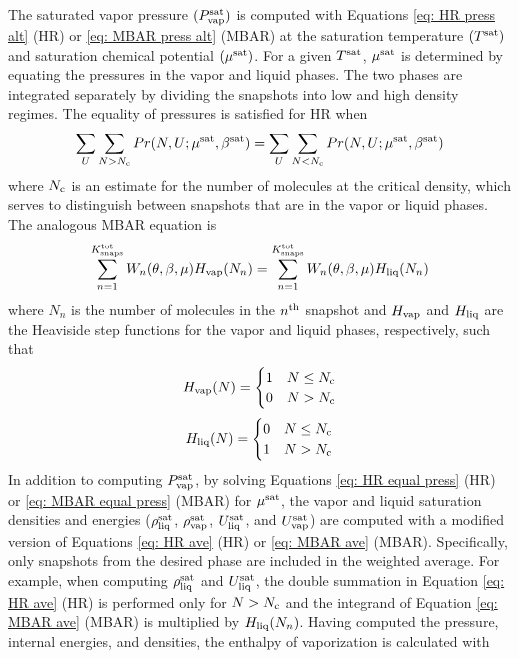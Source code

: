 \documentclass[journal=jced,manuscript=article]{achemso}
\begin{document}
The saturated vapor pressure $(P_{\rm vap}^{\rm sat})$ is computed with Equations \ref{eq: HR press alt} (HR) or \ref{eq: MBAR press alt} (MBAR) at the saturation temperature $(T^{\rm sat})$ and saturation chemical potential $(\mu^{\rm sat})$. For a given $T^{\rm sat}$, $\mu^{\rm sat}$ is determined by equating the pressures in the vapor and liquid phases. The two phases are integrated separately by dividing the snapshots into low and high density regimes. The equality of pressures is satisfied for HR when
\begin{eqnarray} \label{eq: HR equal press}
\sum_{U} \sum_{N > N_{\rm c}} Pr(N,U;\mu^{\rm sat},\beta^{\rm sat}) = \sum_{U} \sum_{N < N_{\rm c}} Pr(N,U;\mu^{\rm sat},\beta^{\rm sat})
\end{eqnarray}
where $N_{\rm c}$ is an estimate for the number of molecules at the critical density, which serves to distinguish between snapshots that are in the vapor or liquid phases. The analogous MBAR equation is
\begin{eqnarray} \label{eq: MBAR equal press}
\sum_{n=1}^{K^{\rm tot}_{\rm snaps}} W_{n}(\theta,\beta,\mu) H_{\rm vap}(N_n) = \sum_{n=1}^{K^{\rm tot}_{\rm snaps}} W_{n}(\theta,\beta,\mu) H_{\rm liq}(N_n)
\end{eqnarray}
where $N_n$ is the number of molecules in the $n^{\rm th}$ snapshot and $H_{\rm vap}$ and $H_{\rm liq}$ are the Heaviside step functions for the vapor and liquid phases, respectively, such that
\begin{eqnarray}
H_{\rm vap}(N) =
 \begin{cases}
 1 & N \leq N_{\rm c} \\
 0 & N > N_{\rm c} 
 \end{cases}
\end{eqnarray}
\begin{eqnarray}
H_{\rm liq}(N) =
\begin{cases}
0 & N \leq N_{\rm c} \\
1 & N > N_{\rm c}
\end{cases}
\end{eqnarray}
In addition to computing $P_{\rm vap}^{\rm sat}$, by solving Equations \ref{eq: HR equal press} (HR) or \ref{eq: MBAR equal press} (MBAR) for $\mu^{\rm sat}$, the vapor and liquid saturation densities and energies ($\rho_{\rm liq}^{\rm sat}$, $\rho_{\rm vap}^{\rm sat}$, $U_{\rm liq}^{\rm sat}$, and $U_{\rm vap}^{\rm sat}$) are computed with a modified version of Equations \ref{eq: HR ave} (HR) or \ref{eq: MBAR ave} (MBAR). Specifically, only snapshots from the desired phase are included in the weighted average. For example, when computing $\rho_{\rm liq}^{\rm sat}$ and $U_{\rm liq}^{\rm sat}$, the double summation in Equation \ref{eq: HR ave} (HR) is performed only for $N > N_{\rm c}$ and the integrand of Equation \ref{eq: MBAR ave} (MBAR) is multiplied by $H_{\rm liq}(N_n)$. Having computed the pressure, internal energies, and densities, the enthalpy of vaporization is calculated with
\end{document}
